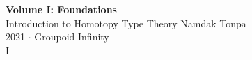\documentclass{article}
\begin{document}
\begin{titlepage}
    \centering
    \vspace*{1in}
    \Huge
    \textbf{Volume I: Foundations} \\
    \vspace{0.5in}
    \LARGE
    Introduction to Homotopy Type Theory
    \vfill
    \large
    Namdak Tonpa \\
    \vspace{0.1in}
    \Large
    2021 $\cdot$ Groupoid Infinity \\
    \vspace{0.5in}
    I
\end{titlepage}

\tableofcontents
\newif\ifincludeTOC
\includeTOCfalse

\newpage \begin{standalone}  \end{standalone}        %
\newpage \begin{standalone}  \end{standalone}         %
\newpage \begin{standalone}  \end{standalone}        %
\newpage \begin{standalone}  \end{standalone}         %
\end{document}
